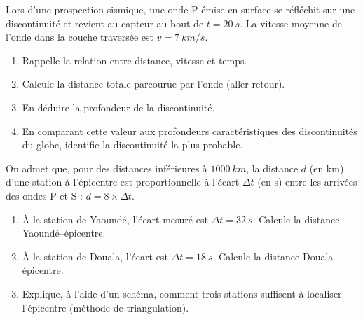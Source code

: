 \documentclass[11pt]{article}
\begin{document}
\begin{exercice}
Lors d'une prospection sismique, une onde P émise en surface se réfléchit sur une discontinuité et revient au capteur au bout de $t = \SI{20}{s}$. La vitesse moyenne de l'onde dans la couche traversée est $v = \SI{7}{km/s}$.
\begin{enumerate}
\item Rappelle la relation entre distance, vitesse et temps.
\item Calcule la distance totale parcourue par l'onde (aller-retour).
\item En déduire la profondeur de la discontinuité.
\item En comparant cette valeur aux profondeurs caractéristiques des discontinuités du globe, identifie la discontinuité la plus probable.
\end{enumerate}
\end{exercice}

\begin{exercice}
On admet que, pour des distances inférieures à $\SI{1000}{km}$, la distance $d$ (en km) d'une station à l'épicentre est proportionnelle à l'écart $\Delta t$ (en s) entre les arrivées des ondes P et S : $d = 8 \times \Delta t$.
\begin{enumerate}
\item À la station de Yaoundé, l'écart mesuré est $\Delta t = \SI{32}{s}$. Calcule la distance Yaoundé--épicentre.
\item À la station de Douala, l'écart est $\Delta t = \SI{18}{s}$. Calcule la distance Douala--épicentre.
\item Explique, à l'aide d'un schéma, comment trois stations suffisent à localiser l'épicentre (méthode de triangulation).
\end{enumerate}
\end{exercice}
\end{document}
